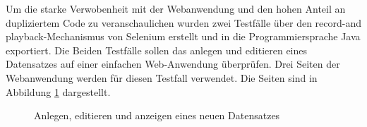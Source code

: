 Um die starke Verwobenheit mit der Webanwendung und den hohen Anteil an dupliziertem Code zu veranschaulichen wurden zwei Testfälle über den \grq record-and playback\grq -Mechanismus von Selenium erstellt und in die Programmiersprache Java exportiert.
Die Beiden Testfälle sollen das anlegen und editieren eines Datensatzes auf einer einfachen Web-Anwendung überprüfen.
Drei Seiten der Webanwendung werden für diesen Testfall verwendet. Die Seiten sind in Abbildung \ref{fig:toDoApp} dargestellt.

\begin{figure}[htb]

 \caption{Anlegen, editieren und anzeigen eines neuen Datensatzes}
  \label{fig:toDoApp}
\end{figure}


